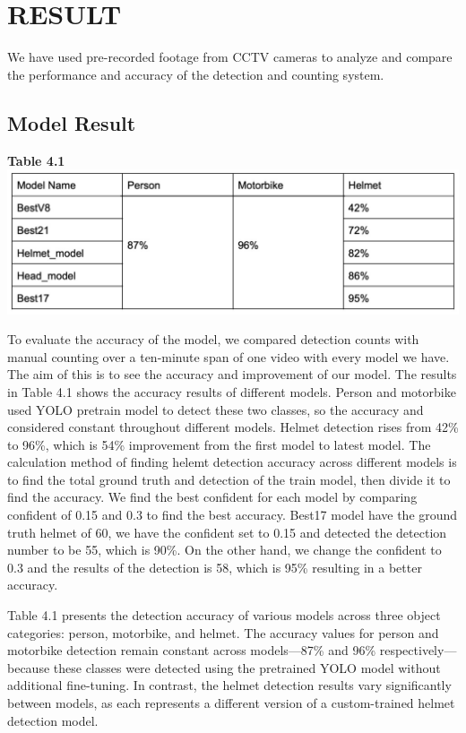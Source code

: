 \chapter{RESULT}

\noindent\hspace{2.5em}We have used pre-recorded footage from CCTV cameras to analyze and compare the performance and accuracy of the detection and counting system. 

\vspace{1em}


\section{Model Result}
\noindent\textbf{Table 4.1} \\
\includegraphics[width=1\textwidth]{table4.1.jpg}


\noindent\hspace{2.5em}To evaluate the accuracy of the model, we compared detection counts with manual counting over a ten-minute span of one video with every model we have. The aim of this is to see the accuracy and improvement of our model. The results in Table 4.1 shows the accuracy results of different models. Person and motorbike used YOLO pretrain model to detect these two classes, so the accuracy and considered constant throughout different models. Helmet detection rises from 42\% to 96\%, which is 54\% improvement from the first model to latest model. The calculation method of finding helemt detection accuracy across different models is to find the total ground truth and detection of the train model, then divide it to find the accuracy. We find the best confident for each model by comparing confident of 0.15 and 0.3 to find the best accuracy. Best17 model have the ground truth helmet of 60, we have the confident set to 0.15 and detected the detection number to be 55, which is 90\%. On the other hand, we change the confident to 0.3 and the results of the detection is 58, which is 95\% resulting in a better accuracy.

Table 4.1 presents the detection accuracy of various models across three object categories: person, motorbike, and helmet. The accuracy values for person and motorbike detection remain constant across models—87\% and 96\% respectively—because these classes were detected using the pretrained YOLO model without additional fine-tuning. In contrast, the helmet detection results vary significantly between models, as each represents a different version of a custom-trained helmet detection model.

